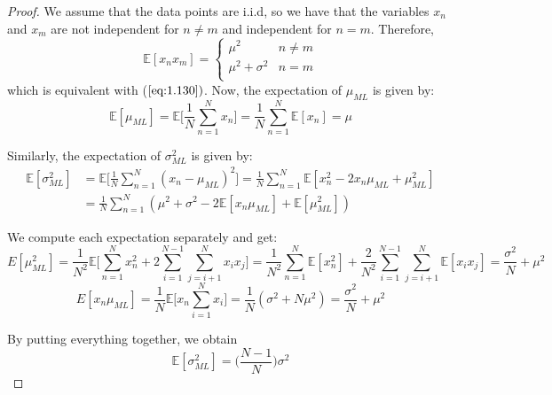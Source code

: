 \vspace{1em}

\begin{proof}
    We assume that the data points are i.i.d, so we have that the variables
    $x_n$ and $x_m$ are not independent for $n \neq m$ and independent for $n = m$.
    Therefore,  
    \[
        \mathbb{E}[x_nx_m] = 
        \begin{cases}
            \mu^2 & n \neq m \\
            \mu^2 + \sigma^2 & n = m \\

        \end{cases}
    \] 
    which is equivalent with ($\ref{eq:1.130})$.
    Now, the expectation of $\mu_{ML}$ is given by:
    \begin{equation}\label{eq:1.57}\tag{1.57}
         \mathbb{E}[\mu_{ML}] 
         = \mathbb{E} \bigg[\frac{1}{N} \sum_{n=1}^{N} x_n\bigg]
         = \frac{1}{N} \sum_{n=1}^{N} \mathbb{E}[x_n] = \mu
    \end{equation}

    Similarly, the expectation of $\sigma_{ML}^2$ is given by: 
    \begin{align*}
        \mathbb{E}[\sigma_{ML}^2] 
        &= \mathbb{E}\bigg[\frac{1}{N} \sum_{n=1}^{N} (x_n - \mu_{ML})^2\bigg]
        = \frac{1}{N} \sum_{n=1}^{N} \mathbb{E} [x_n^2 - 2x_n\mu_{ML} + \mu_{ML}^2] \\
        &= \frac{1}{N} \sum_{n=1}^{N} (\mu^2 + \sigma^2 - 2\mathbb{E}[x_n\mu_{ML}] + \mathbb{E}[\mu_{ML}^2])
    \end{align*}

    We compute each expectation separately and get:
    \[
    E[\mu_{ML}^2]
    = \frac{1}{N^2} \mathbb{E} \bigg[\sum_{n=1}^{N} x_n^2 + 2\sum_{i=1}^{N-1} \sum_{j=i+1}^{N} x_ix_j\bigg]
    = \frac{1}{N^2} \sum_{n=1}^{N} \mathbb{E}[x_n^2] + 
        \frac{2}{N^2} \sum_{i=1}^{N-1} \sum_{j = i+1}^{N} \mathbb{E}[x_ix_j]
    = \frac{\sigma^2}{N} + \mu^2
    \] 
    \[
        E[x_n\mu_{ML}] = \frac{1}{N} \mathbb{E}\bigg[x_n \sum_{i=1}^{N} x_i\bigg]
        = \frac{1}{N} (\sigma^2 + N\mu^2) = \frac{\sigma^2}{N} + \mu^2
    \]

    By putting everything together, we obtain
    \begin{equation}\label{eq:1.58}\tag{1.58}
        \mathbb{E}[\sigma_{ML}^2] = \bigg(\frac{N - 1}{N}\bigg) \sigma^2
    \end{equation}
\end{proof}

